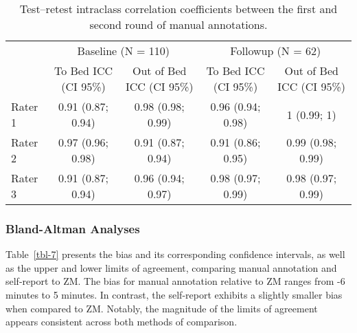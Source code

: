 \documentclass[
  9pt,
]{article}
\begin{document}
\begingroup

\footnotesize

\hypertarget{tbl-man_icc_test_retest}{}
\begin{longtable}{lcccc}
\caption{\label{tbl-man_icc_test_retest}Test--retest intraclass correlation coefficients between the first and
second round of manual annotations. }\tabularnewline

\toprule
 & \multicolumn{2}{c}{Baseline (N = 110)} & \multicolumn{2}{c}{Followup (N = 62)} \\ 
\cmidrule(lr){2-3} \cmidrule(lr){4-5}
 & To Bed
ICC (CI 95\%) & Out of Bed
ICC (CI 95\%) & To Bed
ICC (CI 95\%) & Out of Bed
ICC (CI 95\%) \\ 
\midrule
Rater 1 & 0.91 (0.87; 0.94) & 0.98 (0.98; 0.99) & 0.96 (0.94; 0.98) & 1 (0.99; 1) \\ 
Rater 2 & 0.97 (0.96; 0.98) & 0.91 (0.87; 0.94) & 0.91 (0.86; 0.95) & 0.99 (0.98; 0.99) \\ 
Rater 3 & 0.91 (0.87; 0.94) & 0.96 (0.94; 0.97) & 0.98 (0.97; 0.99) & 0.98 (0.97; 0.99) \\ 
\bottomrule
\end{longtable}

\endgroup

\hypertarget{bland-altman-analyses}{%
\subsubsection{Bland-Altman Analyses}\label{bland-altman-analyses}}

Table~\ref{tbl-7} presents the bias and its corresponding confidence
intervals, as well as the upper and lower limits of agreement, comparing
manual annotation and self-report to ZM. The bias for manual annotation
relative to ZM ranges from -6 minutes to 5 minutes. In contrast, the
self-report exhibits a slightly smaller bias when compared to ZM.
Notably, the magnitude of the limits of agreement appears consistent
across both methods of comparison.

\begingroup

\footnotesize
\end{document}
